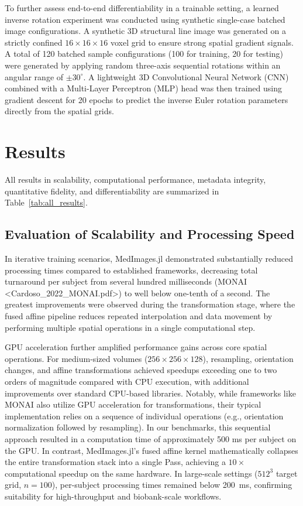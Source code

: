 \documentclass[10pt,letterpaper]{article}
\begin{document}
To further assess end-to-end differentiability in a trainable setting, a learned inverse rotation experiment was conducted using synthetic single-case batched image configurations. A synthetic 3D structural line image was generated on a strictly confined $16 \times 16 \times 16$ voxel grid to ensure strong spatial gradient signals. A total of 120 batched sample configurations (100 for training, 20 for testing) were generated by applying random three-axis sequential rotations within an angular range of $\pm 30^{\circ}$. A lightweight 3D Convolutional Neural Network (CNN) combined with a Multi-Layer Perceptron (MLP) head was then trained using gradient descent for 20 epochs to predict the inverse Euler rotation parameters directly from the spatial grids.

\section{Results }

All results in scalability, computational performance, metadata integrity, quantitative fidelity, and differentiability are summarized in Table~\ref{tab:all_results}.

\subsection*{Evaluation of Scalability and Processing Speed}
In iterative training scenarios, MedImages.jl demonstrated substantially reduced processing times compared to established frameworks, decreasing total turnaround per subject from several hundred milliseconds (MONAI <Cardoso_2022_MONAI.pdf>) to well below one-tenth of a second. The greatest improvements were observed during the transformation stage, where the fused affine pipeline reduces repeated interpolation and data movement by performing multiple spatial operations in a single computational step. 

GPU acceleration further amplified performance gains across core spatial operations. For medium-sized volumes ($256 \times 256 \times 128$), resampling, orientation changes, and affine transformations achieved speedups exceeding one to two orders of magnitude compared with CPU execution, with additional improvements over standard CPU-based libraries. Notably, while frameworks like MONAI also utilize GPU acceleration for transformations, their typical implementation relies on a sequence of individual operations (e.g., orientation normalization followed by resampling). In our benchmarks, this sequential approach resulted in a computation time of approximately 500 ms per subject on the GPU. In contrast, MedImages.jl's fused affine kernel mathematically collapses the entire transformation stack into a single Pass, achieving a $10\times$ computational speedup on the same hardware. In large-scale settings ($512^3$ target grid, $n=100$), per-subject processing times remained below 200~ms, confirming suitability for high-throughput and biobank-scale workflows.
\end{document}
